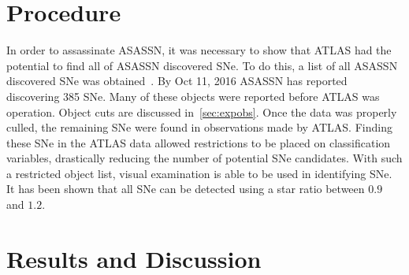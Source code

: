 \documentclass[aps,prb,twocolumn,superscriptaddress]{revtex4-1}
\begin{document}
\section{Procedure}

\indent In order to assassinate ASASSN, it was necessary to show that ATLAS 
had the potential to find all of ASASSN discovered SNe.  
To do this, a list of all ASASSN discovered SNe was obtained~\cite{asn_data}.  
By Oct 11, 2016 ASASSN has reported discovering 385 SNe. Many of these 
objects were reported before ATLAS was operation. Object cuts are discussed 
in~\cref{sec:expobs}. Once the data was properly culled, the remaining SNe 
were found in observations made by ATLAS.  
Finding these SNe in the ATLAS 
data allowed restrictions to be placed on classification variables, drastically 
reducing the number of potential SNe candidates. With such a restricted object 
list, visual examination is able to be used in identifying SNe.  It has been 
shown that all SNe can be detected using a star ratio between $0.9$ and $1.2$.






\section{Results and Discussion}
\end{document}
